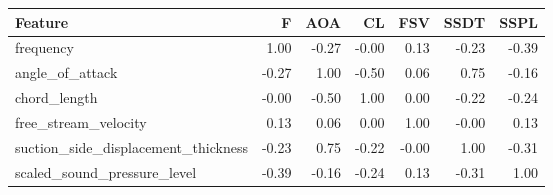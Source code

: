 \begin{tabular}{lrrrrrr}
\toprule
Feature & F & AOA & CL & FSV & SSDT & SSPL \\
\midrule
frequency & 1.00 & -0.27 & -0.00 & 0.13 & -0.23 & -0.39 \\
angle\_of\_attack & -0.27 & 1.00 & -0.50 & 0.06 & 0.75 & -0.16 \\
chord\_length & -0.00 & -0.50 & 1.00 & 0.00 & -0.22 & -0.24 \\
free\_stream\_velocity & 0.13 & 0.06 & 0.00 & 1.00 & -0.00 & 0.13 \\
suction\_side\_displacement\_thickness & -0.23 & 0.75 & -0.22 & -0.00 & 1.00 & -0.31 \\
scaled\_sound\_pressure\_level & -0.39 & -0.16 & -0.24 & 0.13 & -0.31 & 1.00 \\
\bottomrule
\end{tabular}